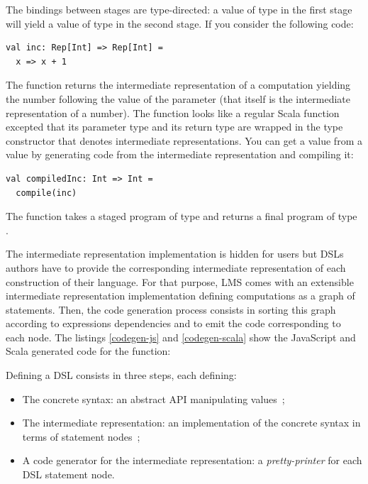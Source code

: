 \documentclass[american,english,runningheads]{llncs}
\begin{document}
The bindings between stages are type-directed: a value of type  in the first stage will yield a value
of type  in the second stage. If you consider the following code:
\begin{lstlisting}
val inc: Rep[Int] => Rep[Int] =
  x => x + 1
\end{lstlisting}
The  function returns the intermediate representation of a computation yielding the number following the
value of the parameter  (that itself is the intermediate representation of a number). The function looks like
a regular Scala function excepted that its parameter type and its return type are wrapped in the  type
constructor that denotes intermediate representations. You can get a  value from a  value by
generating code from the intermediate representation and compiling it:
\begin{lstlisting}
val compiledInc: Int => Int =
  compile(inc)
\end{lstlisting}
The  function takes a staged program of type  and returns a final program of
type .

The intermediate representation implementation is hidden for users but DSLs authors have to provide the corresponding
intermediate representation of each construction of their language. For that purpose, LMS comes with an extensible
intermediate representation implementation defining computations as a graph of statements. Then, the code generation
process consists in sorting this graph according to expressions dependencies and to emit the code corresponding to
each node. The listings \ref{codegen-js} and \ref{codegen-scala} show the JavaScript and Scala generated code for the
 function:
\begin{multicols}{2}


\end{multicols}

Defining a DSL consists in three steps, each defining:

\begin{itemize}
\item The concrete syntax: an abstract API manipulating  values~;
\item The intermediate representation: an implementation of the concrete syntax in terms of statement nodes~;
\item A code generator for the intermediate representation: a \emph{pretty-printer} for each DSL statement node.
\end{itemize}
\end{document}
